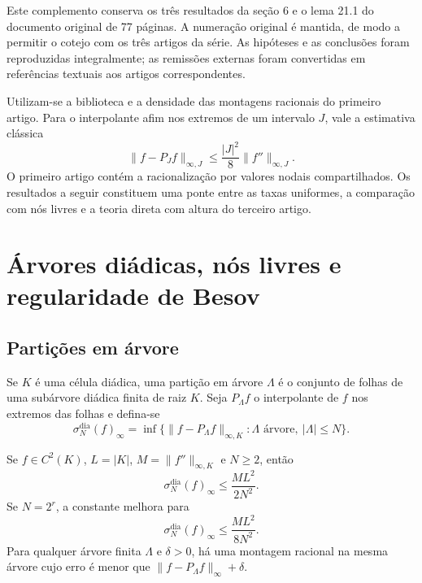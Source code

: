 

Este complemento conserva os três resultados da seção 6 e o lema 21.1 do documento original de 77 páginas. A numeração original é mantida, de modo a permitir o cotejo com os três artigos da série. As hipóteses e as conclusões foram reproduzidas integralmente; as remissões externas foram convertidas em referências textuais aos artigos correspondentes.

Utilizam-se a biblioteca e a densidade das montagens racionais do primeiro artigo. Para o interpolante afim nos extremos de um intervalo $J$, vale a estimativa clássica
\begin{equation}
\|f-P_Jf\|_{\infty,J}\le\frac{|J|^2}{8}\|f''\|_{\infty,J}.
\label{complemento_original:eq:interpolation-remainder}
\end{equation}
O primeiro artigo contém a racionalização por valores nodais compartilhados. Os resultados a seguir constituem uma ponte entre as taxas uniformes, a comparação com nós livres e a teoria direta com altura do terceiro artigo.
\setcounter{section}{5}
\section{Árvores diádicas, nós livres e regularidade de Besov}
\label{complemento_original:sec:dyadic-trees}

\subsection{Partições em árvore}

Se $K$ é uma célula diádica, uma partição em árvore $\Lambda$ é o conjunto de folhas de uma subárvore diádica finita de raiz $K$. Seja $P_\Lambda f$ o interpolante de $f$ nos extremos das folhas e defina-se
\begin{equation}
 \sigma_N^{\mathrm{dia}}(f)_\infty
 =\inf\{\|f-P_\Lambda f\|_{\infty,K}:\Lambda\text{ árvore},\ |\Lambda|\le N\}.
 \label{complemento_original:eq:sigma-dyadic}
\end{equation}

\begin{theorem}\label{map:complemento_original:6.1}\label{complemento_original:thm:tree-rate}
Se $f\in C^2(K)$, $L=|K|$, $M=\|f''\|_{\infty,K}$ e $N\ge2$, então
\begin{equation}
 \sigma_N^{\mathrm{dia}}(f)_\infty\le\frac{ML^2}{2N^2}.
 \label{complemento_original:eq:tree-general}
\end{equation}
Se $N=2^r$, a constante melhora para
\begin{equation}
 \sigma_N^{\mathrm{dia}}(f)_\infty\le\frac{ML^2}{8N^2}.
 \label{complemento_original:eq:tree-power}
\end{equation}
Para qualquer árvore finita $\Lambda$ e $\delta>0$, há uma montagem racional na mesma árvore cujo erro é menor que $\|f-P_\Lambda f\|_\infty+\delta$.
\end{theorem}

